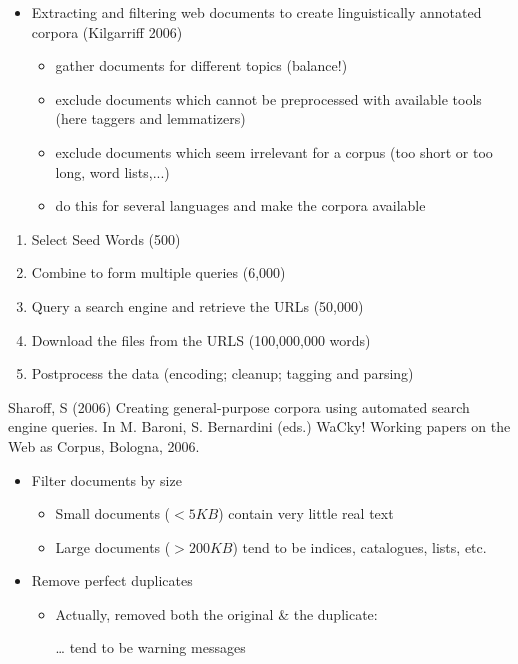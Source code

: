 \documentclass[a4paper,landscape,headrule,footrule,xetex]{foils}
\begin{document}
\MyLogo{}
\begin{itemize}
\item Extracting and filtering web documents to create linguistically
  annotated corpora (Kilgarriff 2006)
  \begin{itemize}
  \item gather documents for different topics (balance!)
  \item exclude documents which cannot be preprocessed with available
    tools (here taggers and lemmatizers)
  \item exclude documents which seem irrelevant for a corpus (too short or
    too long, word lists,...)
  \item do this for several languages and make the corpora available
  \end{itemize}
\end{itemize}



\begin{enumerate}
\item Select Seed Words (500)
\item Combine to form multiple queries (6,000)
\item Query a search engine and retrieve the URLs (50,000)
\item Download the files from the URLS (100,000,000 words)
\item Postprocess the data (encoding; cleanup; tagging and parsing)
\end{enumerate}

Sharoff, S (2006) Creating general-purpose corpora using automated search engine queries. In M. Baroni, S. Bernardini (eds.) WaCky! Working papers on the Web as Corpus, Bologna, 2006.



\begin{itemize}
\item Filter documents by size
  \begin{itemize}
  \item Small documents ($<5KB$) contain very little real text
  \item Large documents ($>200KB$) tend to be indices, catalogues, lists, etc.
  \end{itemize}
\item Remove perfect duplicates
  \begin{itemize}
  \item Actually, removed both the original \& the duplicate:
  \item[\ldots] tend to be warning messages 
  \end{itemize}
\end{itemize}
\end{document}
